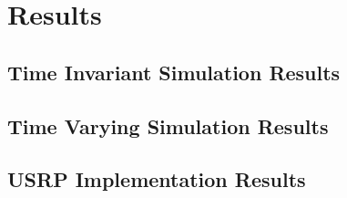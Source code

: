 \chapter{Results}

\section{Time Invariant Simulation Results}


\section{Time Varying Simulation Results}


\section{USRP Implementation Results}


